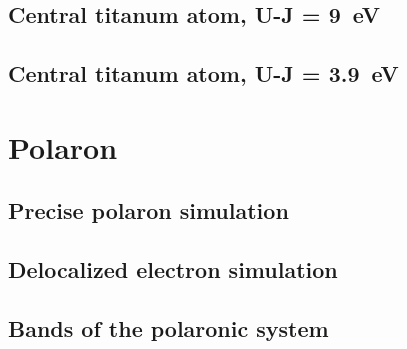 \subsection{Central titanum atom, U-J = \SI{9}{eV}} \label{app:substitution}
\subsection{Central titanum atom, U-J = \SI{3.9}{eV}} \label{app:normal_U}

\section{Polaron}
\subsection{Precise polaron simulation} \label{app:final}
\subsection{Delocalized electron simulation} \label{app:delocalized}
\subsection{Bands of the polaronic system} \label{app:polaron_bands}